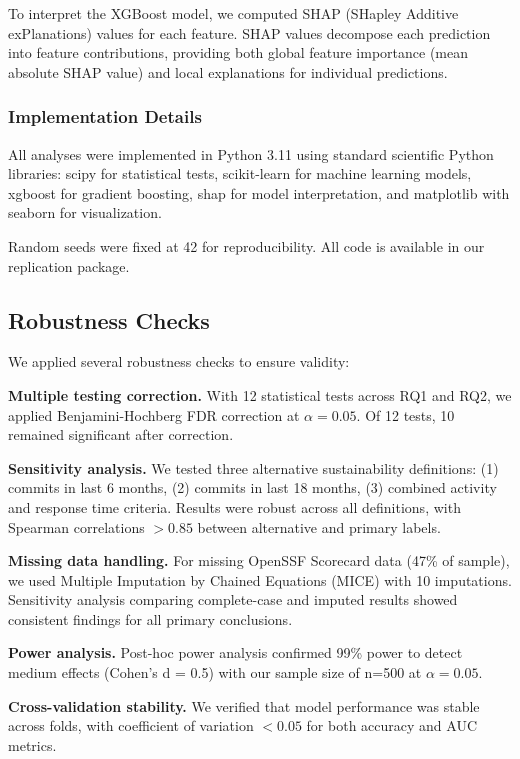 \documentclass[conference]{IEEEtran}
\begin{document}
To interpret the XGBoost model, we computed SHAP (SHapley Additive exPlanations) values for each feature. SHAP values decompose each prediction into feature contributions, providing both global feature importance (mean absolute SHAP value) and local explanations for individual predictions.

\subsubsection{Implementation Details}

All analyses were implemented in Python 3.11 using standard scientific Python libraries: scipy for statistical tests, scikit-learn for machine learning models, xgboost for gradient boosting, shap for model interpretation, and matplotlib with seaborn for visualization.

Random seeds were fixed at 42 for reproducibility. All code is available in our replication package.

\subsection{Robustness Checks}

We applied several robustness checks to ensure validity:

\textbf{Multiple testing correction.} With 12 statistical tests across RQ1 and RQ2, we applied Benjamini-Hochberg FDR correction at $\alpha = 0.05$. Of 12 tests, 10 remained significant after correction.

\textbf{Sensitivity analysis.} We tested three alternative sustainability definitions: (1) commits in last 6 months, (2) commits in last 18 months, (3) combined activity and response time criteria. Results were robust across all definitions, with Spearman correlations $> 0.85$ between alternative and primary labels.

\textbf{Missing data handling.} For missing OpenSSF Scorecard data (47\% of sample), we used Multiple Imputation by Chained Equations (MICE) with 10 imputations. Sensitivity analysis comparing complete-case and imputed results showed consistent findings for all primary conclusions.

\textbf{Power analysis.} Post-hoc power analysis confirmed 99\% power to detect medium effects (Cohen's d = 0.5) with our sample size of n=500 at $\alpha = 0.05$.

\textbf{Cross-validation stability.} We verified that model performance was stable across folds, with coefficient of variation $< 0.05$ for both accuracy and AUC metrics.
\end{document}
